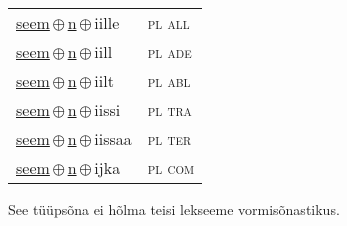 \begin{minipage}{\textwidth}
\begin{sideways}
\begin{tabular}{l l}
\underline{seem}\,$\oplus$\,\underline{n}\,$\oplus$\,iille & \textsc{ pl all } \\
\underline{seem}\,$\oplus$\,\underline{n}\,$\oplus$\,iill & \textsc{ pl ade } \\
\underline{seem}\,$\oplus$\,\underline{n}\,$\oplus$\,iilt & \textsc{ pl abl } \\
\underline{seem}\,$\oplus$\,\underline{n}\,$\oplus$\,iissi & \textsc{ pl tra } \\
\underline{seem}\,$\oplus$\,\underline{n}\,$\oplus$\,iissaa & \textsc{ pl ter } \\
\underline{seem}\,$\oplus$\,\underline{n}\,$\oplus$\,ijka & \textsc{ pl com } \\
\end{tabular}
\end{sideways}
\label{tab:tüüpsõnamall-seemen}

\end{minipage}

 
\vspace{1em}
\noindent See tüüpsõna ei hõlma teisi lekseeme vormi\-sõnastikus.
